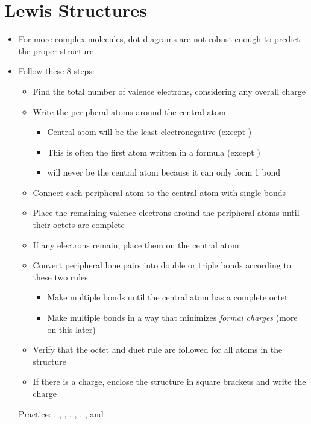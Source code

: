\documentclass[12pt, openany, letterpaper]{memoir}
\begin{document}
\section{Lewis Structures}
\begin{itemize}
	\item For more complex molecules, dot diagrams are not robust enough to predict the proper structure
	\item Follow these 8 steps:
	\begin{itemize}
		\item Find the total number of valence electrons, considering any overall charge
		\item Write the peripheral atoms around the central atom
		\begin{itemize}
			\item Central atom will be the least electronegative (except )
			\item This is often the first atom written in a formula (except )
			\item {} will never be the central atom because it can only form 1 bond
		\end{itemize}
		\item Connect each peripheral atom to the central atom with single bonds
		\item Place the remaining valence electrons around the peripheral atoms until their octets are complete
		\item If any electrons remain, place them on the central atom
		\item Convert peripheral lone pairs into double or triple bonds according to these two rules
		\begin{itemize}
			\item Make multiple bonds until the central atom has a complete octet
			\item Make multiple bonds in a way that minimizes \emph{formal charges} (more on this later)
		\end{itemize}
		\item Verify that the octet and duet rule are followed for all atoms in the structure
		\item If there is a charge, enclose the structure in square brackets and write the charge
	\end{itemize}

	Practice: , , , , , , , and 
\end{itemize}
\end{document}
